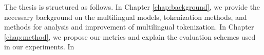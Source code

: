 

The thesis is structured as follows. In Chapter \ref{chap:background}, we provide the necessary background on the multilingual models, tokenization methods, and methods for analysis and improvement of multilingual tokenization. In Chapter \ref{chap:method}, we propose our metrics and explain the evaluation schemes used in our experiments. 
In 





